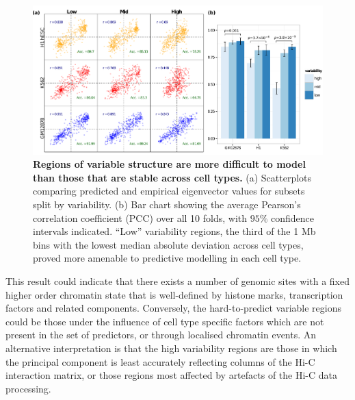 \documentclass[a4paper]{report}
\begin{document}
\begin{figure}[H]
\begin{center}
\includegraphics[width=\textwidth]{figs/strat.pdf}
\captionsetup{width=\textwidth}
\caption{ {\bf Regions of variable structure are more difficult to
    model than those that are stable across cell types.}  (a)
  Scatterplots comparing predicted and empirical eigenvector values
  for subsets split by variability. (b) Bar chart showing the
  average Pearson's correlation coefficient (PCC) over all 10 folds,
  with $95\%$ confidence intervals indicated. ``Low''
  variability regions, the third of the 1 Mb bins with the
  lowest median absolute deviation across cell types, proved more
  amenable to predictive modelling in each cell type. 
}\label{fig:stratvar}
\end{center} 
\end{figure} 

This result could indicate that there exists a number of genomic sites with a fixed
higher order chromatin state that is well-defined by histone marks,
transcription factors and related components. Conversely, the hard-to-predict variable regions could be those under the influence of
cell type specific factors which are not present in the set of
predictors, or through localised chromatin events. An alternative
interpretation is that the high variability regions are those in which
the principal component is least accurately reflecting columns of the
Hi-C interaction matrix, or those regions most affected by artefacts of
the Hi-C data processing. \\
\end{document}
